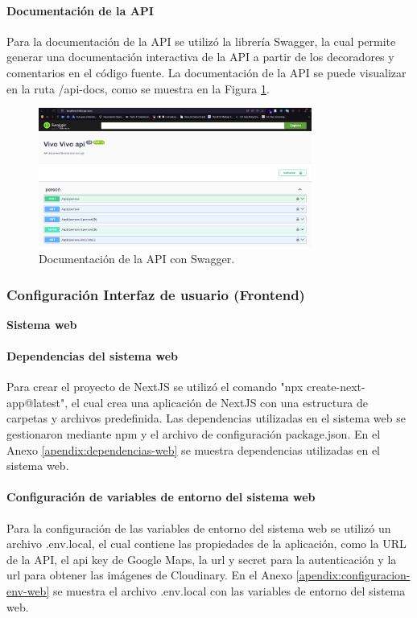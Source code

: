 \paragraph{Documentación de la API}
Para la documentación de la API se utilizó la librería Swagger, la cual permite generar una documentación interactiva de la API a partir de los
decoradores y comentarios en el código fuente. La documentación de la API se puede visualizar en la ruta /api-docs, como se muestra en la Figura
\ref{fih:documentacion-api}.

\begin{figure}[H]
    \centering
    \includegraphics[width=0.8\textwidth]{chapters/III-resultados-y-discusion/resources/images/documentacion-api.png}
    \caption{Documentación de la API con Swagger.}
    \label{fih:documentacion-api}
\end{figure}

\subsubsection{Configuración Interfaz de usuario (Frontend)}

\textbf{Sistema web}
\bigbreak

\paragraph{Dependencias del sistema web}
Para crear el proyecto de NextJS se utilizó el comando "npx create-next-app@latest", el cual crea una aplicación de
NextJS con una estructura de carpetas y archivos predefinida. Las dependencias utilizadas en el sistema web se gestionaron mediante
npm y el archivo de configuración package.json. En el Anexo \ref{apendix:dependencias-web} se muestra dependencias utilizadas en el
sistema web.

\paragraph{Configuración de variables de entorno del sistema web}
Para la configuración de las variables de entorno del sistema web se utilizó un archivo .env.local, el cual contiene las propiedades
de la aplicación, como la URL de la API, el api key de Google Maps, la url y secret para la autenticación y la url
para obtener las imágenes de Cloudinary. En el Anexo \ref{apendix:configuracion-env-web} se muestra el archivo .env.local con las
variables de entorno del sistema web.

